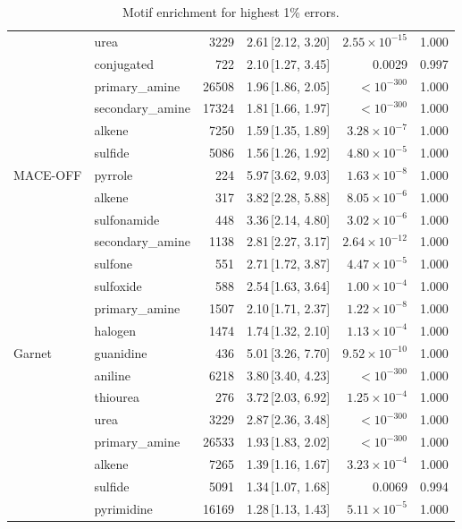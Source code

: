 \begin{table}[t]
\begin{tabular}{llrrrr}
      & urea & 3229 & 2.61\,[2.12, 3.20] & $2.55\times 10^{-15}$ & 1.000 \\
      & conjugated & 722 & 2.10\,[1.27, 3.45] & 0.0029 & 0.997 \\
      & primary\_amine & 26508 & 1.96\,[1.86, 2.05] & $< 10^{-300}$ & 1.000 \\
      & secondary\_amine & 17324 & 1.81\,[1.66, 1.97] & $< 10^{-300}$ & 1.000 \\
      & alkene & 7250 & 1.59\,[1.35, 1.89] & $3.28\times 10^{-7}$ & 1.000 \\
      & sulfide & 5086 & 1.56\,[1.26, 1.92] & $4.80\times 10^{-5}$ & 1.000 \\
    \hline
    MACE-OFF & pyrrole & 224 & 5.97\,[3.62, 9.03] & $1.63\times 10^{-8}$ & 1.000 \\
      & alkene & 317 & 3.82\,[2.28, 5.88] & $8.05\times 10^{-6}$ & 1.000 \\
      & sulfonamide & 448 & 3.36\,[2.14, 4.80] & $3.02\times 10^{-6}$ & 1.000 \\
      & secondary\_amine & 1138 & 2.81\,[2.27, 3.17] & $2.64\times 10^{-12}$ & 1.000 \\
      & sulfone & 551 & 2.71\,[1.72, 3.87] & $4.47\times 10^{-5}$ & 1.000 \\
      & sulfoxide & 588 & 2.54\,[1.63, 3.64] & $1.00\times 10^{-4}$ & 1.000 \\
      & primary\_amine & 1507 & 2.10\,[1.71, 2.37] & $1.22\times 10^{-8}$ & 1.000 \\
      & halogen & 1474 & 1.74\,[1.32, 2.10] & $1.13\times 10^{-4}$ & 1.000 \\
    \hline
    Garnet & guanidine & 436 & 5.01\,[3.26, 7.70] & $9.52\times 10^{-10}$ & 1.000 \\
      & aniline & 6218 & 3.80\,[3.40, 4.23] & $< 10^{-300}$ & 1.000 \\
      & thiourea & 276 & 3.72\,[2.03, 6.92] & $1.25\times 10^{-4}$ & 1.000 \\
      & urea & 3229 & 2.87\,[2.36, 3.48] & $< 10^{-300}$ & 1.000 \\
      & primary\_amine & 26533 & 1.93\,[1.83, 2.02] & $< 10^{-300}$ & 1.000 \\
      & alkene & 7265 & 1.39\,[1.16, 1.67] & $3.23\times 10^{-4}$ & 1.000 \\
      & sulfide & 5091 & 1.34\,[1.07, 1.68] & 0.0069 & 0.994 \\
      & pyrimidine & 16169 & 1.28\,[1.13, 1.43] & $5.11\times 10^{-5}$ & 1.000 \\
    \hline
  \end{tabular}
  \caption{Motif enrichment for highest 1\% errors.}
  \label{tab:split_impropers_worst}
\end{table}